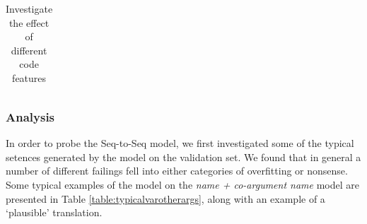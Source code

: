 \begin{table}[!ht]
\begin{center}
\begin{tabular}{ c | c | c }
    
    \hline
\end{tabular}
\caption {Investigate the effect of different code features}
\label{table:tokenization}
\end{center}
\end{table}


\subsubsection{Analysis} %
\label{ssub:analysis}

In order to probe the Seq-to-Seq model, we first investigated some of the typical setences generated by the model on the validation set.
We found that in general a number of different failings fell into either categories of overfitting or nonsense. 
Some typical examples of the model on the \textit{name + co-argument name} model are presented in Table \ref{table:typicalvarotherargs}, along with an example of a `plausible' translation. 


